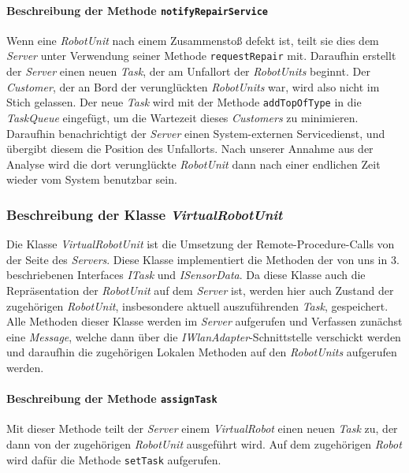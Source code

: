 			\paragraph{Beschreibung der Methode \texttt{notifyRepairService}}
			Wenn eine \textit{RobotUnit} nach einem Zusammenstoß defekt ist, teilt sie dies dem \textit{Server} unter Verwendung seiner Methode \texttt{requestRepair} mit.	Daraufhin erstellt der \textit{Server} einen neuen  \textit{Task}, der am Unfallort der \textit{RobotUnits} beginnt. Der \textit{Customer}, der an Bord der verunglückten \textit{RobotUnits} war, wird also nicht im Stich gelassen. Der neue \textit{Task} wird mit der Methode \texttt{addTopOfType} in die \textit{TaskQueue} eingefügt, um die Wartezeit dieses \textit{Customers} zu minimieren. Daraufhin benachrichtigt der \textit{Server} einen System-externen Servicedienst, und übergibt diesem die Position des Unfallorts. Nach unserer Annahme aus der Analyse wird die dort verunglückte \textit{RobotUnit} dann nach einer endlichen Zeit wieder vom System benutzbar sein.
			
			
			
	\subsubsection{Beschreibung der Klasse \textit{VirtualRobotUnit}}
	Die Klasse \textit{VirtualRobotUnit} ist die Umsetzung der Remote-Procedure-Calls von der Seite des \textit{Servers}. Diese Klasse implementiert die Methoden der von uns in 3. beschriebenen Interfaces \textit{ITask} und \textit{ISensorData}. Da diese Klasse auch die Repräsentation der \textit{RobotUnit} auf dem \textit{Server} ist, werden hier auch Zustand der zugehörigen \textit{RobotUnit}, insbesondere aktuell auszuführenden \textit{Task}, gespeichert. Alle Methoden dieser Klasse werden im \textit{Server} aufgerufen und Verfassen zunächst eine \textit{Message}, welche dann über die \textit{IWlanAdapter}-Schnittstelle verschickt werden und daraufhin die zugehörigen Lokalen Methoden auf den \textit{RobotUnits} aufgerufen werden.
	
			\paragraph{Beschreibung der Methode \texttt{assignTask}}
			Mit dieser Methode teilt der \textit{Server} einem \textit{VirtualRobot} einen neuen \textit{Task} zu, der dann von der zugehörigen \textit{RobotUnit} ausgeführt wird. Auf dem zugehörigen \textit{Robot} wird dafür die Methode \texttt{setTask} aufgerufen.
			
